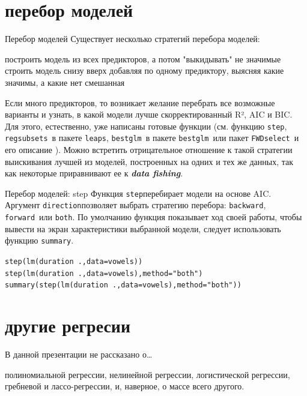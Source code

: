 \section{перебор моделей}
\begin{frame}{Перебор моделей}
Существует несколько стратегий перебора моделей:
\begin{itemize}
\mytem построить модель из всех предикторов, а потом "выкидывать" не значимые
\mytem строить модель снизу вверх добавляя по одному предиктору, выясняя какие значимы, а какие нет
\mytem смешанная
\end{itemize}
\vfill
Если много предикторов, то возникает желание перебрать все возможные варианты и узнать, в какой модели лучше скорректированный R², AIC и BIC. Для этого, естественно, уже написаны готовые функции (см. функцию \scriptsize\verb"step"\normalsize, \scriptsize\verb"regsubsets"\normalsize\ в пакете \scriptsize\verb"leaps"\normalsize, \scriptsize\verb"bestglm"\normalsize\ в пакете \scriptsize\verb"bestglm"\normalsize\ или пакет \scriptsize\verb"FWDselect"\normalsize\  и его описание \citep{sestelo2016}). Можно встретить отрицательное отношение к такой стратегии выискивания лучшей из моделей, построенных на одних и тех же данных, так как некоторые приравнивают ее к \textbf{\textit{data fishing}}.
\end{frame}
\begin{frame}{Перебор моделей: step}
Функция \scriptsize\verb"step"\normalsize перебирает модели на основе AIC. Аргумент \scriptsize\verb"direction"\normalsize позволяет выбрать стратегию перебора: \scriptsize\verb"backward"\normalsize, \scriptsize\verb"forward"\normalsize\ или \scriptsize\verb"both"\normalsize. По умолчанию функция показывает ход своей работы, чтобы вывести на экран характеристики выбранной модели, следует использовать функцию \scriptsize\verb"summary"\normalsize.
\vfill
\scriptsize
\begin{alltt}
step(lm(duration~., data = vowels))\\
step(lm(duration~., data = vowels), method = "both")\\
summary(step(lm(duration~., data = vowels), method = "both"))
\end{alltt}
\normalsize

\end{frame}

\section{другие регресии}
\begin{frame}{В данной презентации не рассказано о…}
\begin{itemize}
\mytem полиномиальной регрессии,
\mytem нелинейной регрессии,
\mytem логистической регрессии,
\mytem гребневой и лассо-регрессии,
\mytem и, наверное, о массе всего другого.
\end{itemize}
\end{frame}
